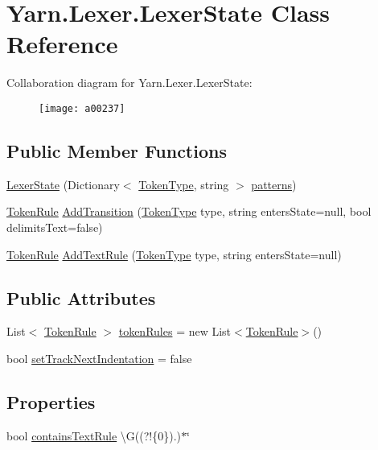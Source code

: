 \hypertarget{a00048}{\section{Yarn.\-Lexer.\-Lexer\-State Class Reference}
\label{a00048}
}


Collaboration diagram for Yarn.\-Lexer.\-Lexer\-State\-:
\nopagebreak
\begin{figure}[H]
\begin{center}
\leavevmode
\texttt{[image: a00237]}
\end{center}
\end{figure}
\subsection*{Public Member Functions}
\begin{DoxyCompactItemize}
\item 
\hyperlink{a00048_ac67a7c0e09d7b4350f75b105723a4f6c}{Lexer\-State} (Dictionary$<$ \hyperlink{a00026_a301aa7c866593a5b625a8fc158bbeace}{Token\-Type}, string $>$ \hyperlink{a00048_a951f91e9522ffe84851f2e25e9445106}{patterns})
\item 
\hyperlink{a00082}{Token\-Rule} \hyperlink{a00048_a71ba52744e853ff142de19e97cf5daed}{Add\-Transition} (\hyperlink{a00026_a301aa7c866593a5b625a8fc158bbeace}{Token\-Type} type, string enters\-State=null, bool delimits\-Text=false)
\item 
\hyperlink{a00082}{Token\-Rule} \hyperlink{a00048_af183111863c651ae5681665a2c379830}{Add\-Text\-Rule} (\hyperlink{a00026_a301aa7c866593a5b625a8fc158bbeace}{Token\-Type} type, string enters\-State=null)
\end{DoxyCompactItemize}
\subsection*{Public Attributes}
\begin{DoxyCompactItemize}
\item 
List$<$ \hyperlink{a00082}{Token\-Rule} $>$ \hyperlink{a00048_adf6563b1dc6f3ef80ed13c2b15b7be03}{token\-Rules} = new List$<$\hyperlink{a00082}{Token\-Rule}$>$()
\item 
bool \hyperlink{a00048_ad8b6ccac53bedd9dc202ffe6ac5698b2}{set\-Track\-Next\-Indentation} = false
\end{DoxyCompactItemize}
\subsection*{Properties}
\begin{DoxyCompactItemize}
\item 
bool \hyperlink{a00048_a69948f05c35eeae9cb8448c849a053e6}{contains\-Text\-Rule} \textbackslash{}G((?!\{0\}).)$\ast$\char`\"{}
\end{DoxyCompactItemize}
